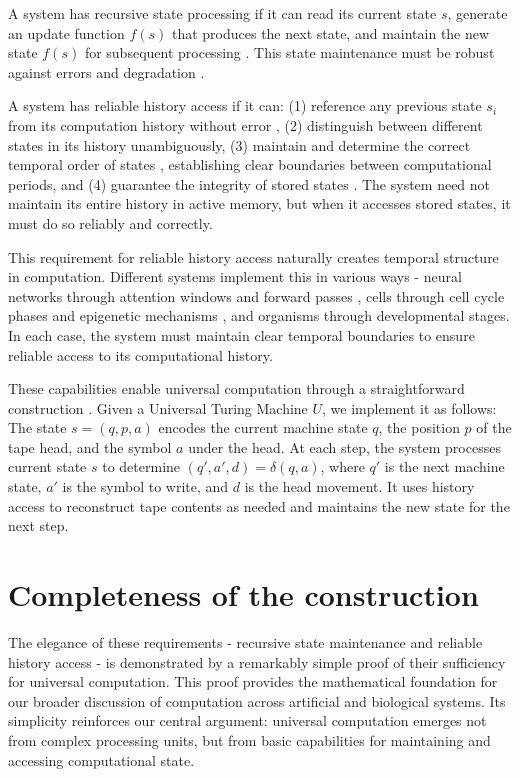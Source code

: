 \documentclass[12pt]{article}
\begin{document}
A system has recursive state processing if it can read its current state $s$, generate an update function $f(s)$ that produces the next state, and maintain the new state $f(s)$ for subsequent processing \cite{manuri2019state}. This state maintenance must be robust against errors and degradation \cite{yang2013survey}.

A system has reliable history access if it can: (1) reference any previous state $s_i$ from its computation history without error \cite{fu2024memory}, (2) distinguish between different states in its history unambiguously, (3) maintain and determine the correct temporal order of states \cite{berridge2014cell,pastor2020computation}, establishing clear boundaries between computational periods, and (4) guarantee the integrity of stored states \cite{lovkvist2021using}. The system need not maintain its entire history in active memory, but when it accesses stored states, it must do so reliably and correctly.

This requirement for reliable history access naturally creates temporal structure in computation. Different systems implement this in various ways - neural networks through attention windows and forward passes \cite{martini2015information,quentin2019differential}, cells through cell cycle phases and epigenetic mechanisms \cite{bruno2022epigenetic}, and organisms through developmental stages. In each case, the system must maintain clear temporal boundaries to ensure reliable access to its computational history.

These capabilities enable universal computation through a straightforward construction \cite{deutsch1995universality,bennett1989time}. Given a Universal Turing Machine $U$, we implement it as follows: The state $s = (q, p, a)$ encodes the current machine state $q$, the position $p$ of the tape head, and the symbol $a$ under the head. At each step, the system processes current state $s$ to determine $(q', a', d) = \delta(q, a)$, where $q'$ is the next machine state, $a'$ is the symbol to write, and $d$ is the head movement. It uses history access to reconstruct tape contents as needed and maintains the new state for the next step.

\section{Completeness of the construction}

The elegance of these requirements - recursive state maintenance and reliable history access - is demonstrated by a remarkably simple proof of their sufficiency for universal computation. This proof provides the mathematical foundation for our broader discussion of computation across artificial and biological systems. Its simplicity reinforces our central argument: universal computation emerges not from complex processing units, but from basic capabilities for maintaining and accessing computational state.
\end{document}
